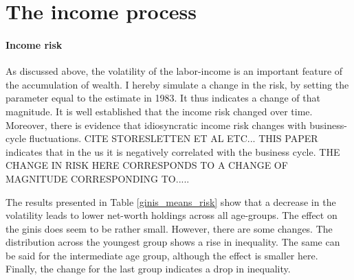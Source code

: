 \documentclass[a4paper,12pt,legno]{article}
\begin{document}
\section{The income process}
\paragraph{Income risk} As discussed above, the volatility of the labor-income is an important feature of the accumulation of wealth. I hereby simulate a change in the risk, by setting the parameter equal to the estimate in 1983. It thus indicates a change of that magnitude. It is well established that the income risk changed over time. Moreover, there is evidence that idiosyncratic income risk changes with business-cycle fluctuations. CITE STORESLETTEN ET AL ETC... THIS PAPER indicates that in the us it is negatively correlated with the business cycle. THE CHANGE IN RISK HERE CORRESPONDS TO A CHANGE OF MAGNITUDE CORRESPONDING TO.....

The results presented in Table \ref{ginis_means_risk} show that a decrease in the volatility leads to lower net-worth holdings across all age-groups. The effect on the ginis does seem to be rather small. However, there are some changes. The distribution across the youngest group shows a rise in inequality. The same can be said for the intermediate age group, although the effect is smaller here. Finally, the change for the last group indicates a drop in inequality. 
\end{document}
